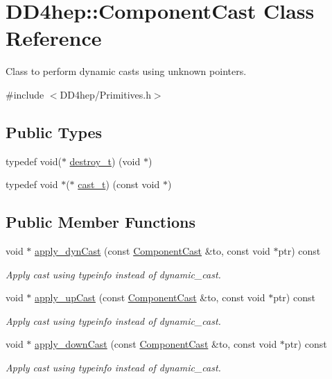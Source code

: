 \hypertarget{class_d_d4hep_1_1_component_cast}{}\section{D\+D4hep\+:\+:Component\+Cast Class Reference}
\label{class_d_d4hep_1_1_component_cast}


Class to perform dynamic casts using unknown pointers.  




{\ttfamily \#include $<$D\+D4hep/\+Primitives.\+h$>$}

\subsection*{Public Types}
\begin{DoxyCompactItemize}
\item 
typedef void($\ast$ \hyperlink{class_d_d4hep_1_1_component_cast_a846aa2764437b52901326d56a1092c59}{destroy\+\_\+t}) (void $\ast$)
\item 
typedef void $\ast$($\ast$ \hyperlink{class_d_d4hep_1_1_component_cast_af22751cad5f2f61dbae30c26c91ac621}{cast\+\_\+t}) (const void $\ast$)
\end{DoxyCompactItemize}
\subsection*{Public Member Functions}
\begin{DoxyCompactItemize}
\item 
void $\ast$ \hyperlink{class_d_d4hep_1_1_component_cast_a8046aba225c46b5e6eb7dedb49c27545}{apply\+\_\+dyn\+Cast} (const \hyperlink{class_d_d4hep_1_1_component_cast}{Component\+Cast} \&to, const void $\ast$ptr) const
\begin{DoxyCompactList}\small\item\em Apply cast using typeinfo instead of dynamic\+\_\+cast. \end{DoxyCompactList}\item 
void $\ast$ \hyperlink{class_d_d4hep_1_1_component_cast_a72d76b159970004a307c6337f6a9292d}{apply\+\_\+up\+Cast} (const \hyperlink{class_d_d4hep_1_1_component_cast}{Component\+Cast} \&to, const void $\ast$ptr) const
\begin{DoxyCompactList}\small\item\em Apply cast using typeinfo instead of dynamic\+\_\+cast. \end{DoxyCompactList}\item 
void $\ast$ \hyperlink{class_d_d4hep_1_1_component_cast_ac606d34384c126a6d927531a1c4f6fa6}{apply\+\_\+down\+Cast} (const \hyperlink{class_d_d4hep_1_1_component_cast}{Component\+Cast} \&to, const void $\ast$ptr) const
\begin{DoxyCompactList}\small\item\em Apply cast using typeinfo instead of dynamic\+\_\+cast. \end{DoxyCompactList}\end{DoxyCompactItemize}

